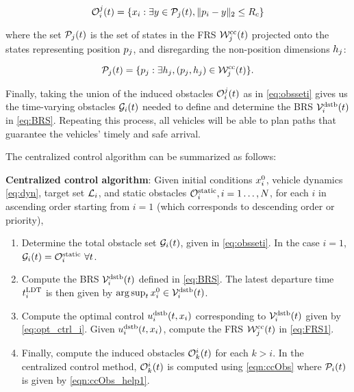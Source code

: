 \begin{equation} \label{eqn:ccObs}
\ioset_i^j(t) = \{\state_i: \exists y \in \pfrs_j(t), \|\pos_i - y\|_2 \le \rc \}
\end{equation}

\noindent where the set $\mathcal{P}_j(t)$ is the set of states in the FRS $\mathcal{W}_j^\text{cc}(t)$ projected onto the states representing position $p_j$, and disregarding the non-position dimensions $h_j$:

\begin{equation} \label{eqn:ccObs_help1}
\pfrs_j(t) = \{p_j: \exists \npos_j, (p_j, \npos_j) \in \frs_j^\text{cc}(t)\}.
\end{equation}

Finally, taking the union of the induced obstacles $\mathcal{O}_i^j(t)$ as in \eqref{eq:obsseti} gives us the time-varying obstacles $\mathcal{G}_i(t)$ needed to define and determine the BRS $\mathcal{V}_i^\text{dstb}(t)$ in \eqref{eq:BRS}. Repeating this process, all vehicles will be able to plan paths that guarantee the vehicles' timely and safe arrival.

The centralized control algorithm can be summarized as follows:
\begin{alg}
\label{alg:cc}
\textbf{Centralized control algorithm}: Given initial conditions $x_i^0$, vehicle dynamics \eqref{eq:dyn}, target set $\mathcal{L}_i$, and static obstacles $\mathcal{O}^\text{static}_i, i = 1\ldots, N$, for each $i$ in ascending order starting from $i=1$ (which corresponds to descending order or priority),
\begin{enumerate}
\item Determine the total obstacle set $\mathcal{G}_i(t)$, given in \eqref{eq:obsseti}. In the case $i=1$, $\mathcal{G}_i(t) = \mathcal{O}^\text{static}_i ~ \forall t$.
\item Compute the BRS $\mathcal{V}_i^\text{dstb}(t)$ defined in \eqref{eq:BRS}. The latest departure time $t^\text{LDT}_i$ is then given by $\arg \sup_t x^0_i \in \mathcal{V}_i^\text{dstb}(t)$.
\item Compute the optimal control $u_i^\text{dstb}(t,x_i)$ corresponding to $\mathcal{V}_i^\text{dstb}(t)$ given by \eqref{eq:opt_ctrl_i}. Given $u_i^\text{dstb}(t,x_i)$, compute the FRS $\mathcal{W}_j^\text{cc}(t)$ in \eqref{eq:FRS1}.
\item Finally, compute the induced obstacles $\mathcal{O}_k^i(t)$ for each $k>i$. In the centralized control method, $\mathcal{O}_k^i(t)$ is computed using \eqref{eqn:ccObs} where $\mathcal{P}_i(t)$ is given by \eqref{eqn:ccObs_help1}.
\end{enumerate}
\end{alg}